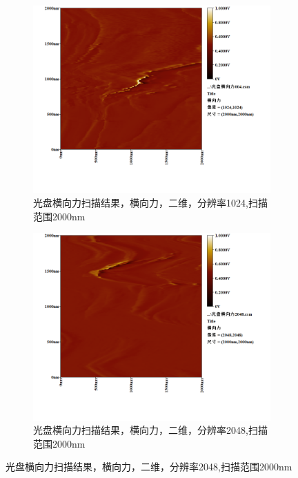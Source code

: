 \documentclass{ctexart}
\begin{document}
\begin{figure}[H]
  \centering
  \begin{subfigure}{.49\textwidth}
    \centering
    \includegraphics[width=\linewidth]{AFM结果图像/光盘横向力_1024_2000nm}
    \caption{光盘横向力扫描结果，横向力，二维，分辨率1024,扫描范围2000nm}
  \end{subfigure}
  \begin{subfigure}{.49\textwidth}
    \centering
    \includegraphics[width=\linewidth]{AFM结果图像/光盘横向力_2048_2000nm}
    \caption{光盘横向力扫描结果，横向力，二维，分辨率2048,扫描范围2000nm}
  \end{subfigure}
\end{figure}
\end{document}
